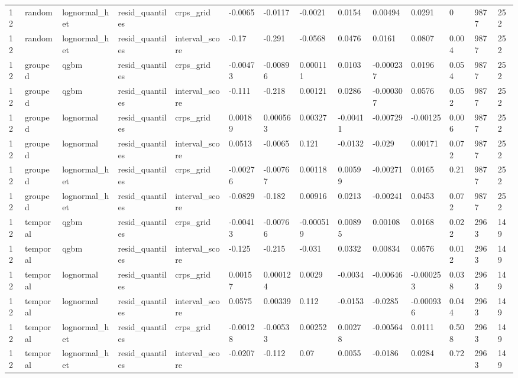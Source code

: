\begin{tabular}{llllllllllllll}
12 & random & lognormal\_het & resid\_quantiles & crps\_grid & -0.0065 & -0.0117 & -0.0021 & 0.0154 & 0.00494 & 0.0291 & 0 & 9877 & 252 \\
12 & random & lognormal\_het & resid\_quantiles & interval\_score & -0.17 & -0.291 & -0.0568 & 0.0476 & 0.0161 & 0.0807 & 0.004 & 9877 & 252 \\
12 & grouped & qgbm & resid\_quantiles & crps\_grid & -0.00473 & -0.00896 & 0.000111 & 0.0103 & -0.000237 & 0.0196 & 0.054 & 9877 & 252 \\
12 & grouped & qgbm & resid\_quantiles & interval\_score & -0.111 & -0.218 & 0.00121 & 0.0286 & -0.000307 & 0.0576 & 0.052 & 9877 & 252 \\
12 & grouped & lognormal & resid\_quantiles & crps\_grid & 0.00189 & 0.000563 & 0.00327 & -0.00411 & -0.00729 & -0.00125 & 0.006 & 9877 & 252 \\
12 & grouped & lognormal & resid\_quantiles & interval\_score & 0.0513 & -0.0065 & 0.121 & -0.0132 & -0.029 & 0.00171 & 0.072 & 9877 & 252 \\
12 & grouped & lognormal\_het & resid\_quantiles & crps\_grid & -0.00276 & -0.00767 & 0.00118 & 0.00599 & -0.00271 & 0.0165 & 0.21 & 9877 & 252 \\
12 & grouped & lognormal\_het & resid\_quantiles & interval\_score & -0.0829 & -0.182 & 0.00916 & 0.0213 & -0.00241 & 0.0453 & 0.072 & 9877 & 252 \\
12 & temporal & qgbm & resid\_quantiles & crps\_grid & -0.00413 & -0.00766 & -0.000519 & 0.00895 & 0.00108 & 0.0168 & 0.022 & 2963 & 149 \\
12 & temporal & qgbm & resid\_quantiles & interval\_score & -0.125 & -0.215 & -0.031 & 0.0332 & 0.00834 & 0.0576 & 0.012 & 2963 & 149 \\
12 & temporal & lognormal & resid\_quantiles & crps\_grid & 0.00157 & 0.000124 & 0.0029 & -0.0034 & -0.00646 & -0.000253 & 0.038 & 2963 & 149 \\
12 & temporal & lognormal & resid\_quantiles & interval\_score & 0.0575 & 0.00339 & 0.112 & -0.0153 & -0.0285 & -0.000936 & 0.044 & 2963 & 149 \\
12 & temporal & lognormal\_het & resid\_quantiles & crps\_grid & -0.00128 & -0.00533 & 0.00252 & 0.00278 & -0.00564 & 0.0111 & 0.508 & 2963 & 149 \\
12 & temporal & lognormal\_het & resid\_quantiles & interval\_score & -0.0207 & -0.112 & 0.07 & 0.0055 & -0.0186 & 0.0284 & 0.72 & 2963 & 149 \\
\bottomrule
\end{tabular}